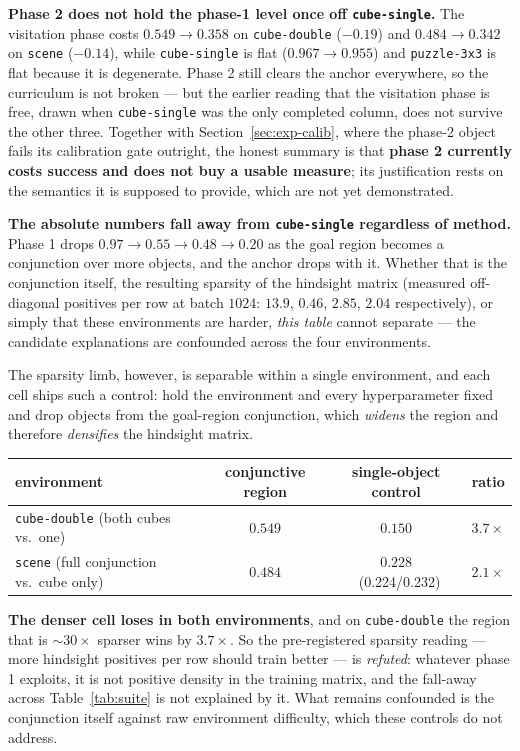 \documentclass[10pt]{article}
\begin{document}
\textbf{Phase 2 does not hold the phase-1 level once off \texttt{cube-single}.} The
visitation phase costs $0.549\to0.358$ on \texttt{cube-double} ($-0.19$) and
$0.484\to0.342$ on \texttt{scene} ($-0.14$), while \texttt{cube-single} is flat
($0.967\to0.955$) and \texttt{puzzle-3x3} is flat because it is degenerate. Phase 2
still clears the anchor everywhere, so the curriculum is not broken --- but the
earlier reading that the visitation phase is free, drawn when \texttt{cube-single} was
the only completed column, does not survive the other three. Together with
Section~\ref{sec:exp-calib}, where the phase-2 object fails its calibration gate
outright, the honest summary is that \textbf{phase 2 currently costs success and does
not buy a usable measure}; its justification rests on the semantics it is supposed to
provide, which are not yet demonstrated.

\textbf{The absolute numbers fall away from \texttt{cube-single} regardless of method.}
Phase 1 drops $0.97 \to 0.55 \to 0.48 \to 0.20$ as the goal region becomes a conjunction
over more objects, and the anchor drops with it. Whether that is the conjunction itself,
the resulting sparsity of the hindsight matrix (measured off-diagonal positives per row at
batch $1024$: $13.9$, $0.46$, $2.85$, $2.04$ respectively), or simply that these
environments are harder, \emph{this table} cannot separate --- the candidate explanations
are confounded across the four environments.

The sparsity limb, however, is separable within a single environment, and each cell ships
such a control: hold the environment and every hyperparameter fixed and drop objects from
the goal-region conjunction, which \emph{widens} the region and therefore \emph{densifies}
the hindsight matrix.

\begin{center}
\small
\begin{tabular}{l c c c}
\toprule
environment & conjunctive region & single-object control & ratio \\
\midrule
\texttt{cube-double} (both cubes vs.\ one) & $\mathbf{0.549}$ & $0.150$ & $3.7\times$ \\
\texttt{scene} (full conjunction vs.\ cube only) & $\mathbf{0.484}$ & $0.228$ \ (0.224/0.232) & $2.1\times$ \\
\bottomrule
\end{tabular}
\end{center}

\textbf{The denser cell loses in both environments}, and on \texttt{cube-double} the
region that is ${\sim}30\times$ sparser wins by $3.7\times$. So the pre-registered
sparsity reading --- more hindsight positives per row should train better --- is
\emph{refuted}: whatever phase 1 exploits, it is not positive density in the training
matrix, and the fall-away across Table~\ref{tab:suite} is not explained by it. What
remains confounded is the conjunction itself against raw environment difficulty, which
these controls do not address.
\end{document}
